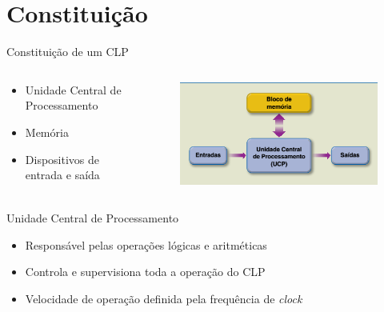 \documentclass[aspectratio=169,
				xcolor=table]{beamer}
\begin{document}
	\section{Constituição}
	\begin{frame}{Constituição de um CLP}
		\begin{columns}
			\begin{column}{0.5\textwidth}
				\begin{itemize}
					\item Unidade Central de Processamento
					\vspace{1em}
					\item Memória
					\vspace{1em}
					\item Dispositivos de entrada e saída
				\end{itemize}
			\end{column}
			\begin{column}{0.5\textwidth}
				\begin{figure}[hbtp]
				\centering
				\includegraphics[width=.9\textwidth, keepaspectratio]{../figs/cap04/constituicao.png}
				\end{figure}
		
			\end{column}
		\end{columns}
	\end{frame}
	
	\begin{frame}{Unidade Central de Processamento}
		\begin{itemize}
			\item Responsável pelas operações lógicas e aritméticas
			\vspace{1em}
			\item Controla e supervisiona toda a operação do CLP
			\vspace{1em}
			\item Velocidade de operação definida pela frequência de \textit{clock}
		\end{itemize}
	\end{frame}	
	
\end{document}
